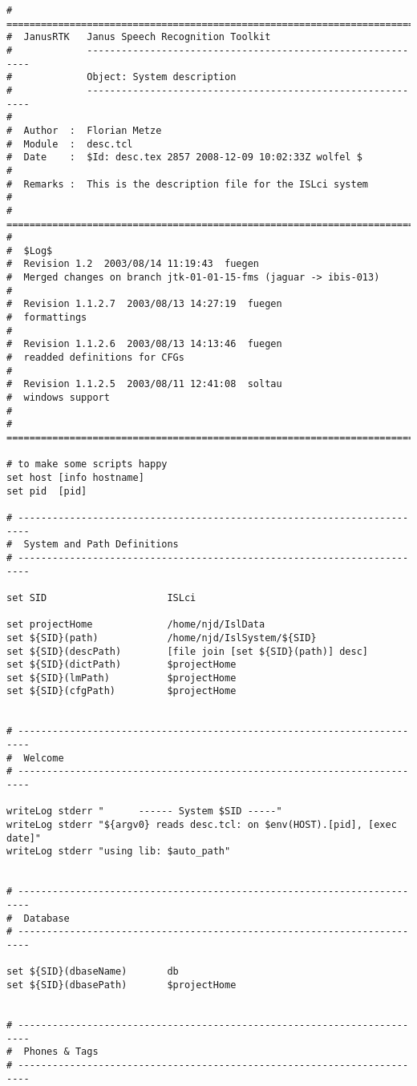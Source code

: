 {\small
\begin{verbatim}
# ========================================================================
#  JanusRTK   Janus Speech Recognition Toolkit
#             ------------------------------------------------------------
#             Object: System description
#             ------------------------------------------------------------
#
#  Author  :  Florian Metze
#  Module  :  desc.tcl
#  Date    :  $Id: desc.tex 2857 2008-12-09 10:02:33Z wolfel $
#
#  Remarks :  This is the description file for the ISLci system
#
# ========================================================================
# 
#  $Log$
#  Revision 1.2  2003/08/14 11:19:43  fuegen
#  Merged changes on branch jtk-01-01-15-fms (jaguar -> ibis-013)
#
#  Revision 1.1.2.7  2003/08/13 14:27:19  fuegen
#  formattings
#
#  Revision 1.1.2.6  2003/08/13 14:13:46  fuegen
#  readded definitions for CFGs
#
#  Revision 1.1.2.5  2003/08/11 12:41:08  soltau
#  windows support
#
# ========================================================================

# to make some scripts happy
set host [info hostname]
set pid  [pid]

# ------------------------------------------------------------------------
#  System and Path Definitions
# ------------------------------------------------------------------------

set SID                     ISLci

set projectHome             /home/njd/IslData
set ${SID}(path)            /home/njd/IslSystem/${SID}
set ${SID}(descPath)        [file join [set ${SID}(path)] desc]
set ${SID}(dictPath)        $projectHome
set ${SID}(lmPath)          $projectHome
set ${SID}(cfgPath)         $projectHome


# ------------------------------------------------------------------------
#  Welcome
# ------------------------------------------------------------------------

writeLog stderr "      ------ System $SID -----"
writeLog stderr "${argv0} reads desc.tcl: on $env(HOST).[pid], [exec date]"
writeLog stderr "using lib: $auto_path"


# ------------------------------------------------------------------------
#  Database
# ------------------------------------------------------------------------

set ${SID}(dbaseName)       db
set ${SID}(dbasePath)       $projectHome


# ------------------------------------------------------------------------
#  Phones & Tags
# ------------------------------------------------------------------------


\end{verbatim}}
